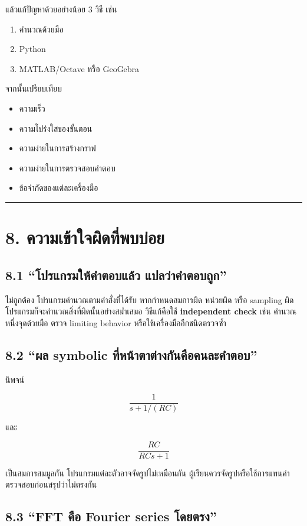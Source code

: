 แล้วแก้ปัญหาด้วยอย่างน้อย 3 วิธี เช่น

\begin{enumerate}
    \item คำนวณด้วยมือ
    \item Python
    \item MATLAB/Octave หรือ GeoGebra
\end{enumerate}

จากนั้นเปรียบเทียบ

\begin{itemize}
    \item ความเร็ว
    \item ความโปร่งใสของขั้นตอน
    \item ความง่ายในการสร้างกราฟ
    \item ความง่ายในการตรวจสอบคำตอบ
    \item ข้อจำกัดของแต่ละเครื่องมือ
\end{itemize}

\par\noindent\rule{\textwidth}{0.4pt}\par
\section{8. ความเข้าใจผิดที่พบบ่อย}

\subsection{8.1 “โปรแกรมให้คำตอบแล้ว แปลว่าคำตอบถูก”}

ไม่ถูกต้อง โปรแกรมคำนวณตามคำสั่งที่ได้รับ หากกำหนดสมการผิด หน่วยผิด หรือ sampling ผิด โปรแกรมก็จะคำนวณสิ่งที่ผิดนั้นอย่างสม่ำเสมอ วิธีแก้คือใช้ \textbf{independent check} เช่น คำนวณหนึ่งจุดด้วยมือ ตรวจ limiting behavior หรือใช้เครื่องมืออีกชนิดตรวจซ้ำ

\subsection{8.2 “ผล symbolic ที่หน้าตาต่างกันคือคนละคำตอบ”}

นิพจน์

\[
\frac{1}{s+1/(RC)}
\]

และ

\[
\frac{RC}{RCs+1}
\]

เป็นสมการสมมูลกัน โปรแกรมแต่ละตัวอาจจัดรูปไม่เหมือนกัน ผู้เรียนควรจัดรูปหรือใช้การแทนค่าตรวจสอบก่อนสรุปว่าไม่ตรงกัน

\subsection{8.3 “FFT คือ Fourier series โดยตรง”}

